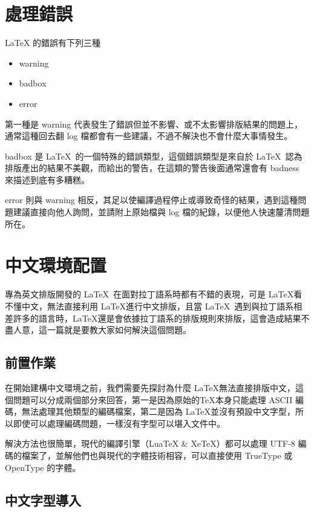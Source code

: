\section{處理錯誤}

LaTeX 的錯誤有下列三種

\begin{itemize}
\item warning
\item badbox
\item error
\end{itemize}

第一種是 warning 代表發生了錯誤但並不影響、或不太影響排版結果的問題上，通常這種回去翻 log 檔都會有一些建議，不過不解決也不會什麼大事情發生。

badbox 是 \LaTeX\ 的一個特殊的錯誤類型，這個錯誤類型是來自於 \LaTeX\ 認為排版產出的結果不美觀，而給出的警告，在這類的警告後面通常還會有 badness 來描述到底有多糟糕。

error 則與 warning 相反，其足以使編譯過程停止或導致奇怪的結果，遇到這種問題建議直接向他人詢問，並請附上原始檔與 log 檔的紀錄，以便他人快速釐清問題所在。

\section{中文環境配置}

專為英文排版開發的 \LaTeX\ 在面對拉丁語系時都有不錯的表現，可是 \LaTeX 看不懂中文，無法直接利用 \LaTeX 進行中文排版，且當 \LaTeX\ 遇到與拉丁語系相差許多的語言時，\LaTeX 還是會依據拉丁語系的排版規則來排版，這會造成結果不盡人意，這一篇就是要教大家如何解決這個問題。

\subsection{前置作業}

在開始建構中文環境之前，我們需要先探討為什麼 \LaTeX 無法直接排版中文，這個問題可以分成兩個部分來回答，第一是因為原始的\TeX 本身只能處理 ASCII 編碼，無法處理其他類型的編碼檔案，第二是因為 \LaTeX 並沒有預設中文字型，所以即使可以處理編碼問題，一樣沒有字型可以堪入文件中。

解決方法也很簡單，現代的編譯引擎（LuaTeX \& XeTeX）都可以處理 UTF-8 編碼的檔案了，並解他們也與現代的字體技術相容，可以直接使用 TrueType 或 OpenType 的字體。

\subsection{中文字型導入}

